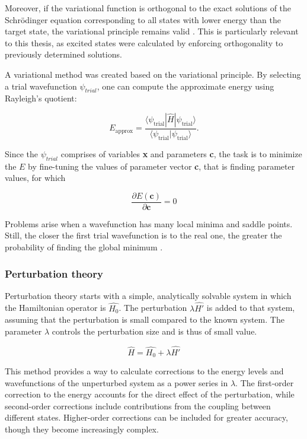 Moreover, if the variational function is orthogonal to the exact solutions of the Schrödinger equation corresponding to all states with lower energy than the target state, the variational principle remains valid \cite{ideas_of_qc}. This is particularly relevant to this thesis, as excited states were calculated by enforcing orthogonality to previously determined solutions.

A variational method was created based on the variational principle. By selecting a trial wavefunction $\psi_{trial}$, one can compute the approximate energy using Rayleigh's quotient:

\begin{equation} E_{\text{approx}} = \frac{\langle \psi_{\text{trial}} | \hat{H} | \psi_{\text{trial}} \rangle}{\langle \psi_{\text{trial}} | \psi_{\text{trial}} \rangle}. \end{equation}

Since the $\psi_{trial}$ comprises of variables \textbf{x} and parameters \textbf{c}, the task is to minimize the $E$  by fine-tuning the values of parameter vector \textbf{c}, that is finding parameter values, for which


\begin{equation} 
	\frac{\partial E(\textbf{c})}{\partial \textbf{c}} = 0
\end{equation}

Problems arise when a wavefunction has many local minima and saddle points. Still, the closer the first trial wavefunction is to the real one, the greater the probability of finding the global minimum \cite{IzaacWang2018ComputationalQM}.

\subsubsection{Perturbation theory}

Perturbation theory starts with a simple, analytically solvable system in which the Hamiltonian operator is $\hat{H_0}$. The perturbation $\lambda \hat{H'}$ is added to that system, assuming that the perturbation is small compared to the known system. The parameter $\lambda$ controls the perturbation size and is thus of small value.

\begin{equation}
	\hat{H} = \hat{H_0} + \lambda \hat{H'}
\end{equation}

This method provides a way to calculate corrections to the energy levels and wavefunctions of the unperturbed system as a power series in $\lambda$. The first-order correction to the energy accounts for the direct effect of the perturbation, while second-order corrections include contributions from the coupling between different states. Higher-order corrections can be included for greater accuracy, though they become increasingly complex.


